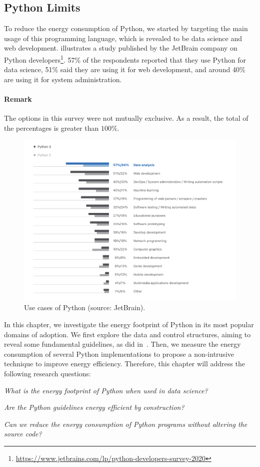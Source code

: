 \subsection{Python Limits}
To reduce the energy consumption of Python, we started by targeting the main usage of this programming language, which is revealed to be data science and web development.
 illustrates a study published by the JetBrain company on Python developers\footnote{\url{https://www.jetbrains.com/lp/python-developers-survey-2020}}.
57\% of the respondents reported that they use Python for data science, 51\% said they are using it for web development, and around 40\% are using it for system administration.
\paragraph{Remark}
The options in this survey were not mutually exclusive. As a result, the total of the percentages is greater than $100\%$.


\begin{figure}[hbt]
    \centering
    \includegraphics[width=\linewidth]{imgs/python_use_cases}
    \caption{Use cases of Python (source: JetBrain).}
    \label{fig:usecase}
\end{figure}

In this chapter, we investigate the energy footprint of Python in its most popular domains of adoption.
We first explore the data and control structures, aiming to reveal some fundamental guidelines, as \citeauthor{hasan_energy_2016-1} did in~\cite{hasan_energy_2016-1}.
Then, we measure the energy consumption of several Python implementations to propose a non-intrusive technique to improve energy efficiency.
Therefore, this chapter will address the following research questions:
\begin{compactenum}[\indent\bf RQ\,1:]
    \item \emph{What is the energy footprint of Python when used in data science?}
    \item \emph{Are the Python guidelines energy efficient by construction?}
    \item \emph{Can we reduce the energy consumption of Python programs without altering the source code?}
\end{compactenum}

